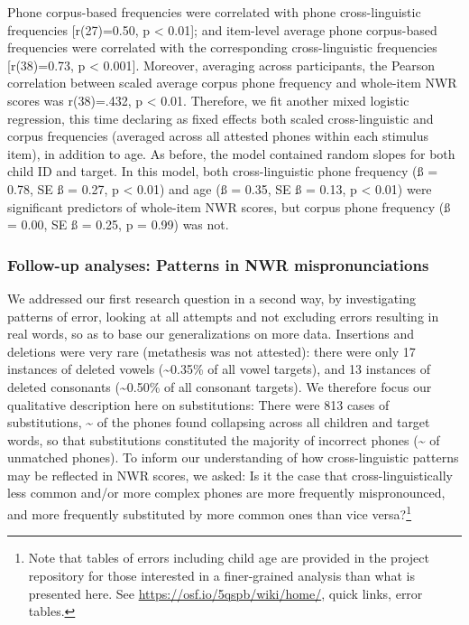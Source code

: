 \documentclass[
  american,
  ,man,floatsintext]{apa6}
\begin{document}
Phone corpus-based frequencies were correlated with phone cross-linguistic frequencies {[}r(27)=0.50, p \textless{} 0.01{]}; and item-level average phone corpus-based frequencies were correlated with the corresponding cross-linguistic frequencies {[}r(38)=0.73, p \textless{} 0.001{]}. Moreover, averaging across participants, the Pearson correlation between scaled average corpus phone frequency and whole-item NWR scores was r(38)=.432, p \textless{} 0.01. Therefore, we fit another mixed logistic regression, this time declaring as fixed effects both scaled cross-linguistic and corpus frequencies (averaged across all attested phones within each stimulus item), in addition to age. As before, the model contained random slopes for both child ID and target. In this model, both cross-linguistic phone frequency (ß = 0.78, SE ß = 0.27, p \textless{} 0.01) and age (ß = 0.35, SE ß = 0.13, p \textless{} 0.01) were significant predictors of whole-item NWR scores, but corpus phone frequency (ß = 0.00, SE ß = 0.25, p = 0.99) was not.

\hypertarget{follow-up-analyses-patterns-in-nwr-mispronunciations}{%
\subsubsection{Follow-up analyses: Patterns in NWR mispronunciations}\label{follow-up-analyses-patterns-in-nwr-mispronunciations}}

We addressed our first research question in a second way, by investigating patterns of error, looking at all attempts and not excluding errors resulting in real words, so as to base our generalizations on more data. Insertions and deletions were very rare (metathesis was not attested): there were only 17 instances of deleted vowels (\textasciitilde0.35\% of all vowel targets), and 13 instances of deleted consonants (\textasciitilde0.50\% of all consonant targets). We therefore focus our qualitative description here on substitutions: There were 813 cases of substitutions, \textasciitilde{} of the phones found collapsing across all children and target words, so that substitutions constituted the majority of incorrect phones (\textasciitilde{} of unmatched phones). To inform our understanding of how cross-linguistic patterns may be reflected in NWR scores, we asked: Is it the case that cross-linguistically less common and/or more complex phones are more frequently mispronounced, and more frequently substituted by more common ones than vice versa?\footnote{Note that tables of errors including child age are provided in the project repository for those interested in a finer-grained analysis than what is presented here. See \url{https://osf.io/5qspb/wiki/home/}, quick links, error tables.}
\end{document}

